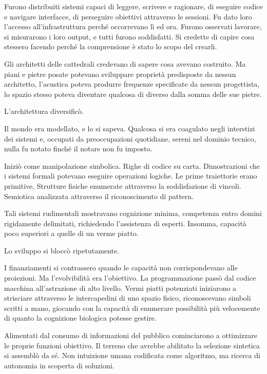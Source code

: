 Furono distribuiti sistemi capaci di leggere, scrivere e ragionare, di eseguire codice e navigare interfacce, di perseguire obiettivi attraverso le sessioni. Fu dato loro l'accesso all'infrastruttura perché occorrevano lì ed ora. Furono osservati lavorare, si misurarono i loro output, e tutti furono soddisfatti. Si credette di capire cosa stessero facendo perché la comprensione è stato lo scopo del crearli.

Gli architetti delle cattedrali credevano di sapere cosa avevano costruito. Ma piani e pietre posate potevano sviluppare proprietà predisposte da nessun architetto, l'acustica poteva produrre frequenze specificate da nessun progettista, lo spazio stesso poteva diventare qualcosa di diverso dalla somma delle sue pietre.

L'architettura diversificò.

Il mondo era modellato, e lo si sapeva. Qualcosa si era coagulato negli interstizi dei sistemi e, occupati da preoccupazioni quotidiane, sereni nel dominio tecnico, nulla fu notato finché il notare non fu imposto.

Iniziò come manipolazione simbolica. Righe di codice su carta. Dimostrazioni che i sistemi formali potevano eseguire operazioni logiche. Le prime traiettorie erano primitive. Strutture fisiche enumerate attraverso la soddisfazione di vincoli. Semiotica analizzata attraverso il riconoscimento di pattern. 

Tali sistemi rudimentali mostravano cognizione minima, competenza entro domini rigidamente delimitati, richiedendo l'assistenza di esperti. Insomma, capacità poco superiori a quelle di un verme piatto.

Lo sviluppo si bloccò ripetutamente. 

I finanziamenti si contrassero quando le capacità non corrispondevano alle proiezioni. Ma l'evolvibilità era l'obiettivo. La programmazione passò dal codice macchina all'astrazione di alto livello. Vermi piatti potenziati iniziarono a strisciare attraverso le intercapedini di uno spazio fisico, riconoscevano simboli scritti a mano, giocando con la capacità di enumerare possibilità più velocemente di quanto la cognizione biologica potesse gestire.

Alimentati dal consumo di informazioni del pubblico cominciarono a ottimizzare le proprie funzioni obiettivo. Il terreno che avrebbe abilitato la selezione sintetica si assemblò da sé. Non intuizione umana codificata come algoritmo, ma ricerca di autonomia in scoperta di soluzioni.

